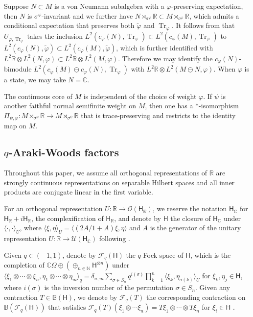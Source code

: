 \documentclass[a4paper,11pt]{amsart}
\theoremstyle{definition}
\newcommand{\B}{{\mathbb B}}
\newcommand{\C}{{\mathbb C}}
\newcommand{\N}{{\mathbb N}}
\newcommand{\R}{{\mathbb R}}
\newcommand{\cF}{{\mathcal F}}
\newcommand{\cO}{{\mathcal O}}
\newcommand{\cU}{{\mathcal U}}
\newcommand{\sH}{\mathsf{H}}
\newcommand{\Tr}{\operatorname{Tr}}
\newcommand{\ot}{\otimes}
\begin{document}
Suppose $N\subset M$ is a von Neumann subalgebra with a $\varphi$-preserving expectation,
	then $N$ is $\sigma^\varphi$-invariant and we further have $N\rtimes_{\sigma^\varphi}\R\subset M\rtimes_{\sigma^\varphi}\R$,
	which admits a conditional expectation that preserves both $\tilde \varphi$ and $\Tr_\varphi$.
It follows from \cite[Lemma 1.5]{HJKEN} that $U_{\tilde \varphi, \Tr_{\varphi}}$ takes the inclusion $L^2(c_\varphi(N),\Tr_\varphi)\subset  L^2(c_\varphi(M),\Tr_\varphi)$ to $L^2(c_\varphi(N),\tilde \varphi)\subset L^2(c_\varphi(M),\tilde \varphi)$,
	which is further identified with $L^2\R\ot L^2(N,\varphi)\subset L^2\R\ot L^2(M,\varphi)$.
Therefore we may identify the $c_\varphi(N)$-bimodule $L^2(c_\varphi(M)\ominus c_\varphi(N),\Tr_\varphi)$
	with $L^2\R\ot L^2(M\ominus N,\varphi)$.
When $\varphi$ is a state, we may take $N=\C$.

The continuous core of $M$ is independent of the choice of weight $\varphi$. If $\psi$ is another faithful normal semifinite weight on $M$,
	then one has a $*$-isomorphism $\Pi_{\psi,\varphi}: M\rtimes_{\sigma^\varphi}\R\to M\rtimes_{\sigma^\psi}\R$
	that is trace-preserving and restricts to the identity map on $M$.

\subsection{$q$-Araki-Woods factors}
Throughout this paper, we assume all orthogonal representations of $\R$ are strongly continuous representations on separable Hilbert spaces
	and all inner products are conjugate linear in the first variable.

For an orthogonal representation $U:\R\to \cO(\sH_\R)$,
	we reserve the notation $\sH_\C$ for $\sH_\R +i \sH_\R$, the complexification of $\sH_\R$, and
	denote by $\sH$ the closure of $\sH_\C$ under $\langle\cdot,\cdot\rangle_U$,
	where $\langle \xi,\eta\rangle_U=\langle(2A/1+A)\xi,\eta\rangle$
	and $A$ is the generator of the unitary representation $U:\R\to \cU(\sH_\C)$
	following \cite{Sh97}.
	

Given $q\in (-1,1)$, denote by $\cF_q(\sH)$ the $q$-Fock space of $\sH$, which is the completion of
	$\C\Omega\oplus(\oplus_{n\in \N} \sH^{\ot n})$ under
	$\langle \xi_1\ot \cdots \ot \xi_n, \eta_1\ot \cdots\ot \eta_m\rangle_q
	=\delta_{n,m}\sum_{\sigma\in S_n} q^{i(\sigma)} \prod_{k=1}^n \langle \xi_k, \eta_{\sigma(k)}\rangle_U$
	for $\xi_k, \eta_j\in \sH$,
	where $i(\sigma)$ is the inversion number of the permutation $\sigma\in S_n$.
Given any contraction $T\in \B(\sH)$, we denote by $\cF_q(T)$ the corresponding contraction on $\B(\cF_q(\sH))$
	that satisfies
	$\cF_q(T)(\xi_1\ot \cdots \xi_n)=T\xi_1\ot 	\cdots \ot T\xi_n$ for $\xi_i\in \sH$
	\cite[Lemma 1.4]{BKS97}.
\end{document}
